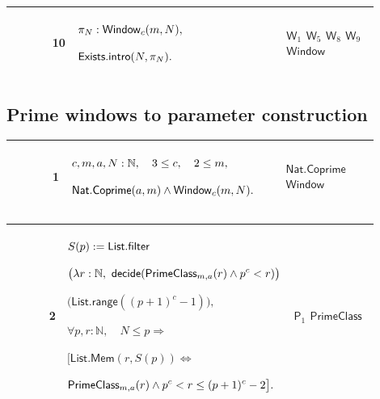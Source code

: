 \documentclass[12pt,reqno]{amsart}
\theoremstyle{blueplain}
\newcounter{type}
\numberwithin{equation}{section}
\begin{document}
{\scriptsize \setlength{\parskip}{0pt}\nointerlineskip
\noindent 
\begin{tabular}{|@{}>{\centering\arraybackslash}m{0.10658\linewidth}|>{\centering\arraybackslash}m{0.03553\linewidth}|>{\centering\arraybackslash}m{0.52105\linewidth}|>{\centering\arraybackslash}m{0.23684\linewidth}|}
\hline
{\hypertarget{row:W10}{$\mathsf{W}$}} & {10} & {$\displaystyle \pi_N: 
\hyperlink{def:Window}{\mathsf{Window} }_c(m,N),$ \par$\displaystyle \mathsf{%
Exists.intro}(N,\pi_N).$} & {\hyperlink{row:W1}{$\mathsf{W}_{1}$} \hyperlink{row:W5}%
{$\mathsf{W}_{5}$} \hyperlink{row:W8}{$\mathsf{W}_{8}$} \hyperlink{row:W9}{$%
\mathsf{W}_{9}$} \hyperlink{def:Window}{$\mathsf{Window}$}} \\ \hline
\end{tabular}%
}

\subsection{Prime windows to parameter construction}

\label{sec:typed-cauchy-proof} {\scriptsize \setlength{\parskip}{0pt}
\noindent 
\begin{tabular}{|@{}>{\centering\arraybackslash}m{0.10658\linewidth}|>{\centering\arraybackslash}m{0.03553\linewidth}|>{\centering\arraybackslash}m{0.52105\linewidth}|>{\centering\arraybackslash}m{0.23684\linewidth}|}
\hline
{\hypertarget{row:P1}{$\mathsf{P}$}} & {1} & {$\displaystyle c,m,a,N:\mathbb{%
N},\quad3\le c,\quad2\le m,$ \par$\displaystyle \hyperlink{def:Nat.Coprime}{%
\mathsf{Nat.Coprime} }(a,m)\wedge \hyperlink{def:Window}{\mathsf{Window} }%
_c(m,N).$} & {\hyperlink{def:Nat.Coprime}{$\mathsf{Nat.Coprime}$} \hyperlink{def:Window}%
{$\mathsf{Window}$}} \\ \hline
\end{tabular}%
}

{\scriptsize \setlength{\parskip}{0pt}\nointerlineskip
\noindent 
\begin{tabular}{|@{}>{\centering\arraybackslash}m{0.10658\linewidth}|>{\centering\arraybackslash}m{0.03553\linewidth}|>{\centering\arraybackslash}m{0.52105\linewidth}|>{\centering\arraybackslash}m{0.23684\linewidth}|}
\hline
{\hypertarget{row:P2}{$\mathsf{P}$}} & {2} & {$\displaystyle S(p):=\mathsf{%
List.filter}$ \par$\displaystyle \bigl(\lambda r:\mathbb{N},\ \mathsf{decide}%
(\hyperlink{def:PrimeClass}{\mathsf{PrimeClass} }_{m,a}(r)\wedge p^c<r)%
\bigr)
$ \par$\displaystyle \bigl(\mathsf{List.range}((p+1)^c-1)\bigr),$ \par$%
\displaystyle \forall p,r:\mathbb{N},\quad N\le p\Rightarrow$ \par$%
\displaystyle \bigl[\mathsf{List.Mem}(r,S(p))\Longleftrightarrow$ \par$%
\displaystyle \hyperlink{def:PrimeClass}{\mathsf{PrimeClass} }%
_{m,a}(r)\wedge p^c<r\le(p+1)^c-2\bigr].$} & {\hyperlink{row:P1}{$\mathsf{P}%
_{1}$} \hyperlink{def:PrimeClass}{$\mathsf{PrimeClass}$}} \\ \hline
\end{tabular}%
}
\end{document}
